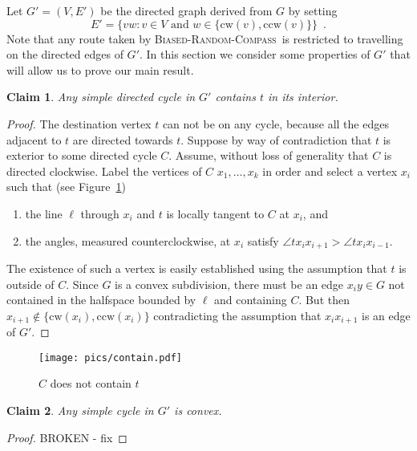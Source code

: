 \documentclass [letterpaper] {article}
\newcommand{\cw}{\mathrm{cw}}
\newcommand{\ccw}{\mathrm{ccw}}
\newcommand{\brc}{\textsc{Biased-Random-Compass}}
\newtheorem{claim}{Claim}
\begin{document}
Let $G'=(V,E')$ be the directed graph derived from $G$ by setting
\[
   E' = \{ vw : \mbox{$v\in V$ and $w\in\{\cw(v),\ccw(v)\}$} \} \enspace .
\]
Note that any route taken by \brc\ is restricted to travelling on the directed edges of $G'$.  In this section we consider some properties of $G'$ that will allow us to prove our main result.

\begin{claim}
\label{claim:contain}
Any simple directed cycle in $G'$ contains $t$ in its interior.
\end{claim}

\begin{proof}
The destination vertex $t$ can not be on any cycle, because all the edges adjacent to $t$ are directed towards $t$. Suppose by way of contradiction that $t$ is exterior to some directed cycle $C$. Assume, without loss of generality that $C$ is directed clockwise.  Label the vertices of $C$ $x_1,\ldots,x_k$ in order and select a vertex $x_i$
such that (see Figure~\ref{fig:contain})
\begin{enumerate}
\item the line $\ell$ through $x_i$ and $t$ is locally tangent to $C$ at $x_i$, and 
\item the angles, measured counterclockwise, at $x_i$ satisfy $\angle tx_{i}x_{i+1} > \angle tx_{i}x_{i-1}$.
\end{enumerate}
The existence of such a vertex is easily established using the assumption that $t$ is outside of $C$.
Since $G$ is a convex subdivision, there must be an edge $x_{i}y \in G$ not contained in the halfspace bounded by $\ell$ and containing $C$.  But then $x_{i+1}\not\in\{\cw(x_i),\ccw(x_i)\}$ contradicting the assumption that $x_i x_{i+1}$ is an edge of $G'$. 
\end{proof}

\begin{figure}[ht]
  \centering
  \texttt{[image: pics/contain.pdf]}
  \caption{$C$ does not contain $t$}
  \label{fig:contain}
\end{figure}

\begin{claim}
\label{claim:convex}
   Any simple cycle in $G'$ is convex.
\end{claim}

\begin{proof}
%
%
%
BROKEN - fix
\end{proof}
\end{document}
